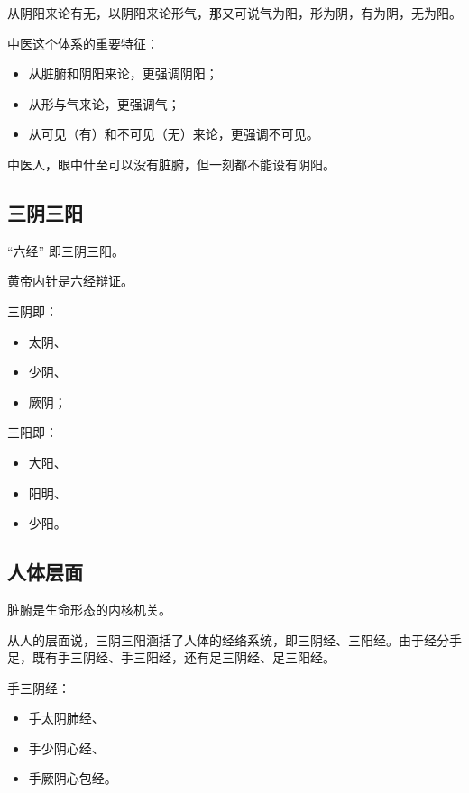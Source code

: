 \documentclass[
]{book}
\providecommand{\tightlist}{%
  \setlength{\itemsep}{0pt}\setlength{\parskip}{0pt}}
\begin{document}
从阴阳来论有无，以阴阳来论形气，那又可说气为阳，形为阴，有为阴，无为阳。

中医这个体系的重要特征：

\begin{itemize}
\tightlist
\item
  从脏腑和阴阳来论，更强调阴阳；
\item
  从形与气来论，更强调气；
\item
  从可见（有）和不可见（无）来论，更强调不可见。
\end{itemize}

中医人，眼中什至可以没有脏腑，但一刻都不能设有阴阳。

\subsection{三阴三阳}\label{ux4e09ux9634ux4e09ux9633}

``六经'' 即三阴三阳。

黄帝内针是六经辩证。

三阴即：

\begin{itemize}
\tightlist
\item
  太阴、
\item
  少阴、
\item
  厥阴；
\end{itemize}

三阳即：

\begin{itemize}
\tightlist
\item
  大阳、
\item
  阳明、
\item
  少阳。
\end{itemize}

\subsection{人体层面}\label{ux4ebaux4f53ux5c42ux9762}

脏腑是生命形态的内核机关。

从人的层面说，三阴三阳涵括了人体的经络系统，即三阴经、三阳经。由于经分手足，既有手三阴经、手三阳经，还有足三阴经、足三阳经。

手三阴经：

\begin{itemize}
\tightlist
\item
  手太阴肺经、
\item
  手少阴心经、
\item
  手厥阴心包经。
\end{itemize}
\end{document}
